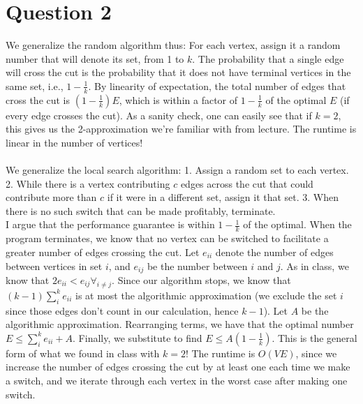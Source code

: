 \documentclass[12pt]{article}
\begin{document}
\section*{Question 2}
We generalize the random algorithm thus: For each vertex, assign it a random number that will denote its set, from 1 to $k$. The probability that a single edge will cross the cut is the probability that it does not have terminal vertices in the same set, i.e., $1-\frac{1}{k}$. By linearity of expectation, the total number of edges that cross the cut is $(1-\frac{1}{k})E$, which is within a factor of $1-\frac{1}{k}$ of the optimal $E$ (if every edge crosses the cut). As a sanity check, one can easily see that if $k=2$, this gives us the 2-approximation we're familiar with from lecture. The runtime is linear in the number of vertices!\\\\
We generalize the local search algorithm: 1. Assign a random set to each vertex. 2. While there is a vertex contributing $c$ edges across the cut that could contribute more than $c$ if it were in a different set, assign it that set. 3. When there is no such switch that can be made profitably, terminate.\\ I argue that the performance guarantee is within $1-\frac{1}{k}$ of the optimal. When the program terminates, we know that no vertex can be switched to facilitate a greater number of edges crossing the cut. Let $e_{ii}$ denote the number of edges between vertices in set $i$, and $e_{ij}$ be the number between $i$ and $j$. As in class, we know that $2e_{ii} < e_{ij} \forall_{i \neq j}$. Since our algorithm stops, we know that $(k-1) \sum_i^k e_{ii}$ is at most the algorithmic approximation (we exclude the set $i$ since those edges don't count in our calculation, hence $k-1$). Let $A$ be the algorithmic approximation. Rearranging terms, we have that the optimal number $E \leq \sum_i^k e_{ii} + A$. Finally, we substitute to find
$E \leq A (1-\frac{1}{k})$. This is the general form of what we found in class with $k=2$! The runtime is $O(VE)$, since we increase the number of edges crossing the cut by at least one each time we make a switch, and we iterate through each vertex in the worst case after making one switch. 
\end{document}
